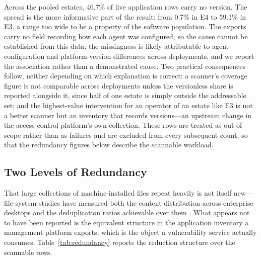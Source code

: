 \documentclass[fleqn,10pt,lineno]{wlpeerj}
\begin{document}


Across the pooled estates, 46.7\% of live application rows carry no version. The spread is the more informative part of the result: from 0.7\% in E4 to 59.1\% in E3, a range too wide to be a property of the software population. The exports carry no field recording how each agent was configured, so the cause cannot be established from this data; the missingness is likely attributable to agent configuration and platform-version differences across deployments, and we report the association rather than a demonstrated cause. Two practical consequences follow, neither depending on which explanation is correct: a scanner's coverage figure is not comparable across deployments unless the versionless share is reported alongside it, since half of one estate is simply outside the addressable set; and the highest-value intervention for an operator of an estate like E3 is not a better scanner but an inventory that records versions---an upstream change in the access control platform's own collection. These rows are treated as out of scope rather than as failures and are excluded from every subsequent count, so that the redundancy figures below describe the scannable workload.

\subsection{Two Levels of Redundancy}
That large collections of machine-installed files repeat heavily is not itself new---file-system studies have measured both the content distribution across enterprise desktops \cite{douceur1999} and the deduplication ratios achievable over them \cite{meyer2012}. What appears not to have been reported is the equivalent structure in the application inventory a management platform exports, which is the object a vulnerability service actually consumes. Table~\ref{tab:redundancy} reports the reduction structure over the scannable rows.


\end{document}
